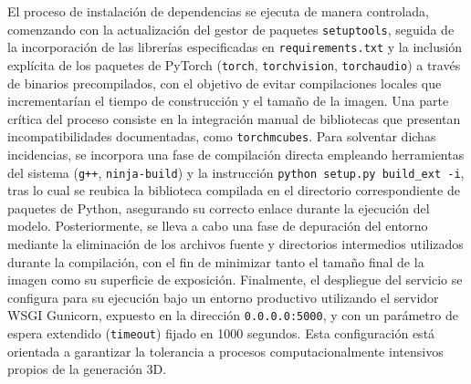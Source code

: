






El proceso de instalación de dependencias se ejecuta de manera controlada, comenzando con la actualización del gestor de paquetes \verb|setuptools|, seguida de la incorporación de las librerías especificadas en \verb|requirements.txt| y la inclusión explícita de los paquetes de PyTorch (\verb|torch|, \verb|torchvision|, \verb|torchaudio|) a través de binarios precompilados, con el objetivo de evitar compilaciones locales que incrementarían el tiempo de construcción y el tamaño de la imagen. Una parte crítica del proceso consiste en la integración manual de bibliotecas que presentan incompatibilidades documentadas, como \verb|torchmcubes|. Para solventar dichas incidencias, se incorpora una fase de compilación directa empleando herramientas del sistema (\verb|g++|, \verb|ninja-build|) y la instrucción \verb|python setup.py build_ext -i|, tras lo cual se reubica la biblioteca compilada en el directorio correspondiente de paquetes de Python, asegurando su correcto enlace durante la ejecución del modelo. Posteriormente, se lleva a cabo una fase de depuración del entorno mediante la eliminación de los archivos fuente y directorios intermedios utilizados durante la compilación, con el fin de minimizar tanto el tamaño final de la imagen como su superficie de exposición. Finalmente, el despliegue del servicio se configura para su ejecución bajo un entorno productivo utilizando el servidor WSGI Gunicorn, expuesto en la dirección \verb|0.0.0.0:5000|, y con un parámetro de espera extendido (\verb|timeout|) fijado en 1000 segundos. Esta configuración está orientada a garantizar la tolerancia a procesos computacionalmente intensivos propios de la generación 3D.




